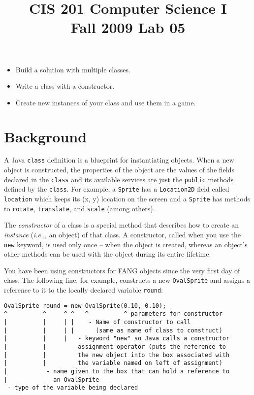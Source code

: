 \documentclass[12pt,twoside]{memoir}
\title{CIS 201 Computer Science I\\Fall 2009 Lab #1}%
\makeatletter
\newcommand\foreign[1]{\emph{#1}}
\newcommand\ensurecomma{\@ifnextchar,{}{\@latex@error{Don’t forget the
      comma!}{}}}
\newcommand\ie{\foreign{i.e.}\ensurecomma}
\newcommand\code[1]{\lstinline^#1^}
\newcommand{\lab}[1]{%
\title{CIS 201 Computer Science I\\Fall 2009 Lab #1}%
\maketitle%
}
\makeatother
\begin{document}
\lab{05}

\begin{itemize}
\item Build a solution with multiple classes.
\item Write a class with a constructor.
\item Create new instances of your class and use them in a game.
\end{itemize}

\section*{Background}
A Java \code{class} definition is a blueprint for instantiating
objects. When a new object is constructed, the properties of the
object are the values of the fields declared in the \code{class} and
its available services are just the \code{public} methods defined by
the \code{class}. For example, a \code{Sprite} has a
\code{Location2D} field called \code{location} which keeps its (x, y)
location on the screen and a \code{Sprite} has methods to
\code{rotate}, \code{translate}, and \code{scale} (among others). 

The {\em constructor} of a class is a special method that describes
how to create an {\em instance} (\ie, an object) of that class.  A
constructor, called when you use the \code{new} keyword, is used only
once -- when the object is created, whereas an object's other methods
can be used with the object during its entire lifetime.

You have been using constructors for FANG objects since the very first
day of class. The following line, for example, constructs a new
\code{OvalSprite} and assigns a reference to it to the locally
declared variable \code{round}:

\begin{lstlisting}
OvalSprite round = new OvalSprite(0.10, 0.10);
^          ^     ^ ^   ^          ^-parameters for constructor
|          |     | |    - Name of constructor to call
|          |     | |      (same as name of class to construct)
|          |     |   - keyword "new" so Java calls a constructor
|          |       - assignment operator (puts the reference to 
|          |         the new object into the box associated with 
|          |         the variable named on left of assignment)
|           - name given to the box that can hold a reference to
|             an OvalSprite
 - type of the variable being declared
\end{lstlisting}
\end{document}
